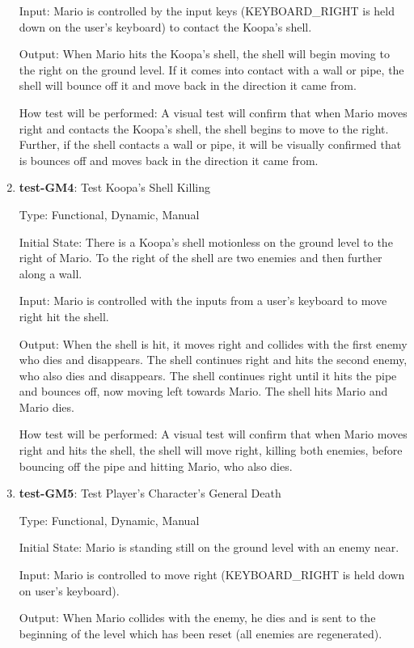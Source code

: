 \documentclass[12pt, titlepage]{article}
\begin{document}
\begin{enumerate}
Input: Mario is controlled by the input keys (KEYBOARD\_RIGHT is held down on the user's keyboard) to contact the Koopa's shell.
					
Output: When Mario hits the Koopa's shell, the shell will begin moving to the right on the ground level. If it comes into contact with a wall or pipe, the shell will bounce off it and move back in the direction it came from.
					
How test will be performed: A visual test will confirm that when Mario moves right and contacts the Koopa's shell, the shell begins to move to the right. Further, if the shell contacts a wall or pipe, it will be visually confirmed that is bounces off and moves back in the direction it came from.

\item{\textbf{test-GM4}: Test Koopa's Shell Killing\\}

Type: Functional, Dynamic, Manual
					
Initial State: There is a Koopa's shell motionless on the ground level to the right of Mario. To the right of the shell are two enemies and then further along a wall.
					
Input: Mario is controlled with the inputs from a user's keyboard to move right hit the shell.
					
Output: When the shell is hit, it moves right and collides with the first enemy who dies and disappears. The shell continues right and hits the second enemy, who also dies and disappears. The shell continues right until it hits the pipe and bounces off, now moving left towards Mario. The shell hits Mario and Mario dies.
					
How test will be performed: A visual test will confirm that when Mario moves right and hits the shell, the shell will move right, killing both enemies, before bouncing off the pipe and hitting Mario, who also dies.

\item{\textbf{test-GM5}: Test Player's Character's General Death\\}

Type: Functional, Dynamic, Manual
					
Initial State: Mario is standing still on the ground level with an enemy near.
					
Input: Mario is controlled to move right (KEYBOARD\_RIGHT is held down on user's keyboard).
					
Output: When Mario collides with the enemy, he dies and is sent to the beginning of the level which has been reset (all enemies are regenerated).
					

\end{enumerate}
\end{document}
